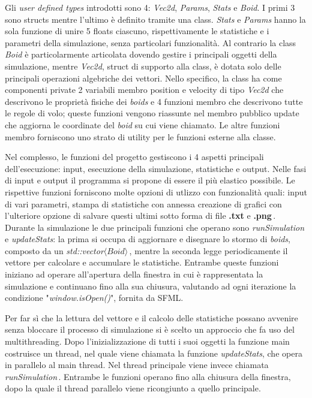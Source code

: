 \documentclass{article}
\begin{document}
Gli \textit{user defined types} introdotti sono 4: \textit
{Vec\textunderscore2d}, \textit{Params}, \textit{Stats} e \textit{Boid}. I primi
3 sono structs mentre l'ultimo è definito tramite una class. \textit{Stats} e 
\textit{Params} hanno la sola funzione di unire 5 floats ciascuno, 
rispettivamente le statistiche e i parametri della simulazione, senza 
particolari funzionalità. Al contrario la class \textit{Boid} è particolarmente
articolata dovendo gestire i principali oggetti della simulazione, mentre 
\textit{Vec\textunderscore2d}, struct di supporto alla class, è dotata solo 
delle principali operazioni algebriche dei vettori. Nello specifico, la class ha
come componenti private 2 variabili membro position e velocity di tipo 
\textit{Vec\textunderscore2d} che descrivono le proprietà fisiche dei 
\textit{boids} e 4 funzioni membro che descrivono tutte le regole di volo; 
queste funzioni vengono riassunte nel membro pubblico update che aggiorna le 
coordinate del \textit{boid} su cui viene chiamato. Le altre funzioni membro 
forniscono uno strato di utility per le funzioni esterne alla classe.


Nel complesso, le funzioni del progetto gestiscono i 4 aspetti principali 
dell'esecuzione: input, esecuzione della simulazione, statistiche e output. 
Nelle fasi di input e output il programma si propone di essere il più elastico 
possibile. Le rispettive funzioni forniscono molte opzioni di utlizzo con 
funzionalità quali: input di vari parametri, stampa di statistiche con annessa 
creazione di grafici con l'ulteriore opzione di salvare questi ultimi sotto 
forma di file \textbf{.txt} e \textbf{.png}\,. Durante la simulazione le due 
principali funzioni che operano sono \textit{runSimulation} e \textit
{updateStats}: la prima si occupa di aggiornare e disegnare lo stormo di 
\textit{boids}, composto da un \textit{std::vector$\langle Boid\rangle$}\,, 
mentre la seconda legge periodicamente il vettore  per calcolare e accumulare le 
statistiche. Entrambe queste funzioni iniziano ad operare all'apertura della 
finestra in cui è rappresentata la simulazione e continuano fino alla sua 
chiusura, valutando ad ogni iterazione la condizione "\textit{window.isOpen()}",
 fornita da SFML. 

Per far sì che la lettura del vettore e il calcolo delle statistiche possano 
avvenire senza bloccare il processo di simulazione si è scelto un approccio che 
fa uso del multithreading. Dopo l'inizializzazione di tutti i suoi oggetti la 
funzione main costruisce un thread, nel quale viene chiamata la funzione 
\textit{updateStats}, che opera in parallelo al main thread. Nel thread 
principale viene invece chiamata  \textit{runSimulation}\,. Entrambe le funzioni 
operano fino alla chiusura della finestra, dopo la quale il thread parallelo 
viene ricongiunto a quello principale. 
\end{document}
